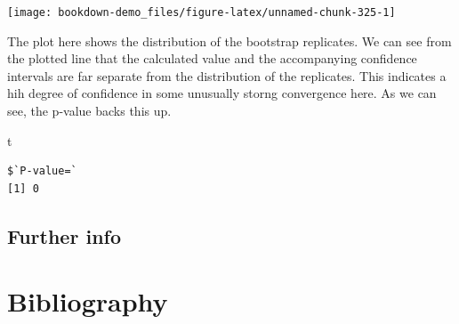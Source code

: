\documentclass[
]{book}
\newenvironment{Shaded}{\begin{snugshade}}{\end{snugshade}}
\newcommand{\NormalTok}[1]{#1}
\begin{document}
\begin{center}\texttt{[image: bookdown-demo\_files/figure-latex/unnamed-chunk-325-1]} \end{center}

The plot here shows the distribution of the bootstrap replicates. We can see from the plotted line that the calculated value and the accompanying confidence intervals are far separate from the distribution of the replicates. This indicates a hih degree of confidence in some unusually storng convergence here. As we can see, the p-value backs this up.

\begin{Shaded}
\begin{Highlighting}[]
\NormalTok{t}
\end{Highlighting}
\end{Shaded}

\begin{verbatim}
$`P-value=`
[1] 0
\end{verbatim}

\hypertarget{further-info-6}{%
\section{Further info}\label{further-info-6}}

\hypertarget{bibliography}{%
\chapter{Bibliography}\label{bibliography}}

  
\end{document}
